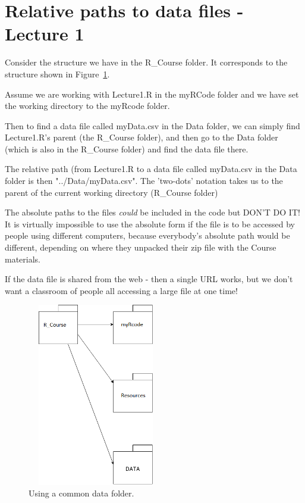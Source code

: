 \documentclass[titlepage]{book}\usepackage{knitr}
\begin{document}
\section{Relative paths to data files - Lecture 1}\label{DataStructure}

Consider the structure we have in the R\_Course folder.  It corresponds to the structure shown in Figure~\ref{fig:pch}. 

Assume we are working with Lecture1.R in the myRCode folder and we have set the working directory to the myRcode folder.  

Then to find a data file called myData.csv in the Data folder, we can simply find Lecture1.R's parent (the R\_Course folder), and then go to the Data folder (which is also in the R\_Course folder) and find the data file there. 

The relative path (from Lecture1.R to a data file called myData.csv in the Data folder is then "../Data/myData.csv". The 'two-dots' notation takes us to the parent of the current working directory (R\_Course folder)

The absolute paths to the files \emph{could} be included in the code but DON'T DO IT!  It is virtually impossible to use the absolute form if the file is to be accessed by people using different computers, because everybody's absolute  path would be different, depending on where they unpacked their zip file with the Course materials.

If the data file is shared from the web - then a single URL works, but we don't want a classroom of people all accessing a large file at one time!



\begin{figure}[!ht]
\graphicspath{{./Images/}}
\includegraphics[width=6cm, height = 8cm]{dataFolder2.png}
\caption{Using a common data folder.}
\label{fig:pch}
\end{figure}
\end{document}
